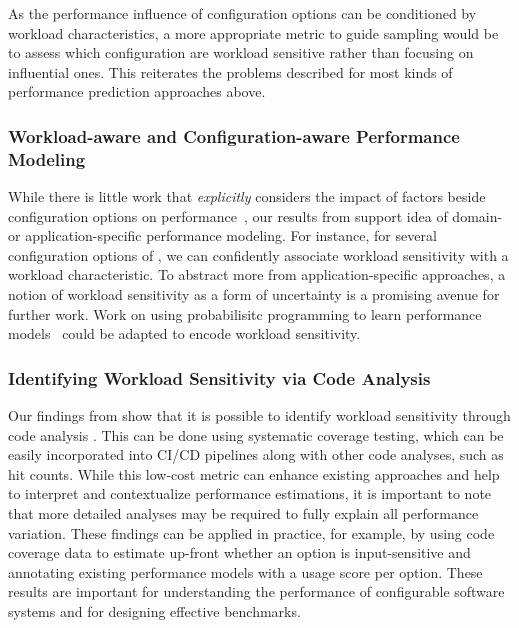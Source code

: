 {{{As the performance influence of configuration options can be conditioned by workload characteristics, a more appropriate metric to guide sampling would be to assess which configuration are workload sensitive rather than focusing on influential ones. This reiterates the problems described for most kinds of performance prediction approaches above.

\subsubsection{Workload-aware and Configuration-aware Performance Modeling} While there is little work that \textit{explicitly} considers the impact of factors beside configuration options on performance~\cite{koc_satune_2021}, our results from  support idea of domain- or application-specific performance modeling. For instance, for several configuration options of \jumper, we can confidently associate workload sensitivity with a workload characteristic. To abstract more from application-specific approaches, a notion of workload sensitivity as a form of uncertainty is a promising avenue for further work. Work on using probabilisitc programming to learn performance models~\cite{dorn2020} could be adapted to encode workload sensitivity.



\subsubsection{Identifying Workload Sensitivity via Code Analysis}
Our findings from  show that it is possible to identify workload sensitivity through code analysis . This can be done using systematic coverage testing, which can be easily incorporated into CI/CD pipelines along with other code analyses, such as hit counts. While this low-cost metric can enhance existing approaches and help to interpret and contextualize performance estimations, it is important to note that more detailed analyses may be required to fully explain all performance variation.
These findings can be applied in practice, for example, by using code coverage data to estimate up-front whether an option is input-sensitive and annotating existing performance models with a usage score per option. These results are important for understanding the performance of configurable software systems and for designing effective benchmarks.

}}}
